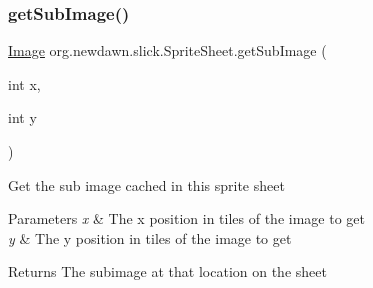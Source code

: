 \mbox{\label{classorg_1_1newdawn_1_1slick_1_1_sprite_sheet_a66c998ab00c7183ca0b41514132431a1}} 
\subsubsection{\texorpdfstring{get\+Sub\+Image()}{getSubImage()}}
{\footnotesize\ttfamily \mbox{\hyperlink{classorg_1_1newdawn_1_1slick_1_1_image}{Image}} org.\+newdawn.\+slick.\+Sprite\+Sheet.\+get\+Sub\+Image (\begin{DoxyParamCaption}\item[{int}]{x,  }\item[{int}]{y }\end{DoxyParamCaption})\hspace{0.3cm}{\ttfamily [inline]}}

Get the sub image cached in this sprite sheet


\begin{DoxyParams}{Parameters}
{\em x} & The x position in tiles of the image to get \\
\hline
{\em y} & The y position in tiles of the image to get \\
\hline
\end{DoxyParams}
\begin{DoxyReturn}{Returns}
The subimage at that location on the sheet 
\end{DoxyReturn}

